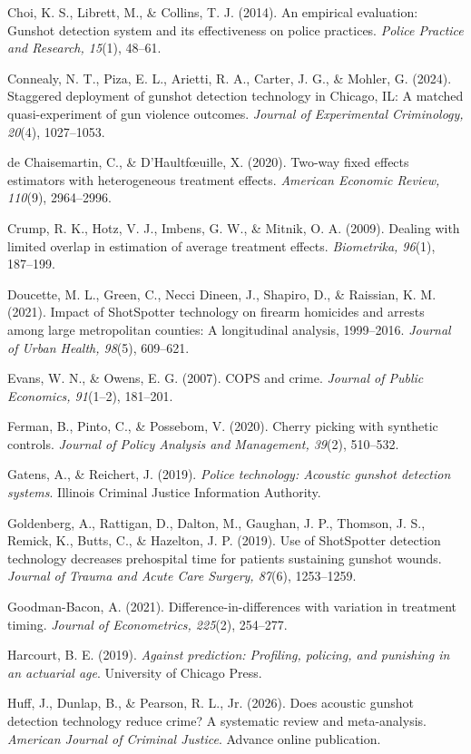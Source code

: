 \documentclass[12pt]{article}
\begin{document}
\begin{flushleft}
Choi, K. S., Librett, M., \& Collins, T. J. (2014). An empirical evaluation: Gunshot
detection system and its effectiveness on police practices. \emph{Police Practice and
Research, 15}(1), 48--61.

Connealy, N. T., Piza, E. L., Arietti, R. A., Carter, J. G., \& Mohler, G. (2024).
Staggered deployment of gunshot detection technology in Chicago, IL: A matched
quasi-experiment of gun violence outcomes. \emph{Journal of Experimental Criminology,
20}(4), 1027--1053.

de Chaisemartin, C., \& D'Haultf\oe uille, X. (2020). Two-way fixed effects estimators with
heterogeneous treatment effects. \emph{American Economic Review, 110}(9), 2964--2996.

Crump, R. K., Hotz, V. J., Imbens, G. W., \& Mitnik, O. A. (2009). Dealing with limited
overlap in estimation of average treatment effects. \emph{Biometrika, 96}(1), 187--199.

Doucette, M. L., Green, C., Necci Dineen, J., Shapiro, D., \& Raissian, K. M. (2021).
Impact of ShotSpotter technology on firearm homicides and arrests among large
metropolitan counties: A longitudinal analysis, 1999--2016. \emph{Journal of Urban
Health, 98}(5), 609--621.

Evans, W. N., \& Owens, E. G. (2007). COPS and crime. \emph{Journal of Public Economics,
91}(1--2), 181--201.

Ferman, B., Pinto, C., \& Possebom, V. (2020). Cherry picking with synthetic controls.
\emph{Journal of Policy Analysis and Management, 39}(2), 510--532.

Gatens, A., \& Reichert, J. (2019). \emph{Police technology: Acoustic gunshot detection
systems}. Illinois Criminal Justice Information Authority.

Goldenberg, A., Rattigan, D., Dalton, M., Gaughan, J. P., Thomson, J. S., Remick, K.,
Butts, C., \& Hazelton, J. P. (2019). Use of ShotSpotter detection technology decreases
prehospital time for patients sustaining gunshot wounds. \emph{Journal of Trauma and Acute
Care Surgery, 87}(6), 1253--1259.

Goodman-Bacon, A. (2021). Difference-in-differences with variation in treatment timing.
\emph{Journal of Econometrics, 225}(2), 254--277.

Harcourt, B. E. (2019). \emph{Against prediction: Profiling, policing, and punishing in
an actuarial age}. University of Chicago Press.

Huff, J., Dunlap, B., \& Pearson, R. L., Jr. (2026). Does acoustic gunshot detection
technology reduce crime? A systematic review and meta-analysis. \emph{American Journal of
Criminal Justice}. Advance online publication.


\end{flushleft}
\end{document}
